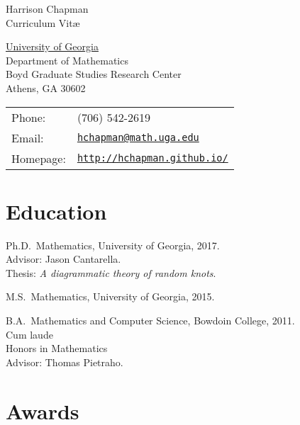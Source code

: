 \documentclass[letterpaper]{article}
\def\name{Harrison Chapman}
\renewenvironment{itemize}{
  \begin{list}{}{
    \setlength{\leftmargin}{1.5em}
  }
}{
  \end{list}
}
\begin{document}
{\huge \name}\\
{\large\sc Curriculum Vit\ae}


\vspace{0.25in}

\begin{minipage}{0.45\linewidth}
  \href{http://www.uga.edu/}{University of Georgia} \\
  Department of Mathematics \\
  Boyd Graduate Studies Research Center \\
  Athens, GA 30602
\end{minipage}
\begin{minipage}{0.45\linewidth}
  \begin{tabular}{ll}
    Phone: & (706) 542-2619 \\
    Email: & \href{mailto:hchapman@math.uga.edu}{\tt hchapman@math.uga.edu} \\
    Homepage: & \href{http://hchapman.github.io/}{\tt http://hchapman.github.io/} \\
  \end{tabular}
\end{minipage}

\section*{Education}

\begin{itemize}
\item Ph.D.\ Mathematics, University of Georgia, 2017.\\
  \textbullet \quad Advisor: Jason Cantarella.\\
  \textbullet \quad Thesis: \emph{A diagrammatic theory of random knots}.
\item M.S.\ Mathematics, University of Georgia, 2015.
\item B.A.\ Mathematics and Computer Science, Bowdoin College,
  2011.\\
  \textbullet \quad Cum laude \\
  \textbullet \quad Honors in Mathematics \\
  \textbullet \quad Advisor: Thomas Pietraho.
\end{itemize}

 \section*{Awards}
\end{document}
